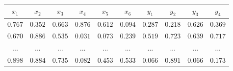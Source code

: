 {%
  \makeatletter
    \DeclareRobustCommand\myvdots{%
      \vbox{%
        \baselineskip4\p@%
        \lineskiplimit\z@%
        \vspace{3pt}\hbox{.}\hbox{.}\hbox{.}%
      }%
    }
  \makeatother
  \begin{tabular}{|c|c|c|c|c|c|c|c|c|c|}
    \hline
      $x_1$ & $x_2$ & $x_3$ & $x_4$ & $x_5$ & $x_6$
      & $y_1$ & $y_2$ & $y_3$ & $y_4$ \\
    \hline
      $0.767$ & $0.352$ & $0.663$ & $0.876$ & $0.612$
      & $0.094$ & $0.287$ & $0.218$ & $0.626$ & $0.369$ \\
      $0.670$ & $0.886$ & $0.535$ & $0.031$ & $0.073$
      & $0.239$ & $0.519$ & $0.723$ & $0.639$ & $0.717$ \\
      \myvdots & \myvdots & \myvdots & \myvdots &\myvdots
      & \myvdots & \myvdots & \myvdots & \myvdots & \myvdots\\
      $0.898$ & $0.884$ & $0.735$ & $0.082$ & $0.453$
      & $0.533$ & $0.066$ & $0.891$ & $0.066$ & $0.173$ \\
    \hline
  \end{tabular}%
}
